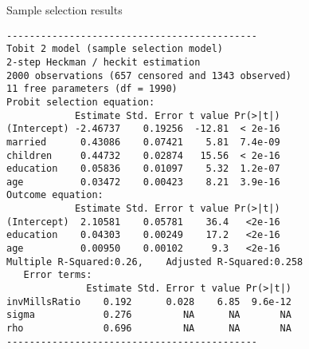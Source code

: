 \documentclass[10pt,ignorenonframetext,]{beamer}
\begin{document}
\begin{frame}[fragile]{Sample selection results}

\scriptsize

\begin{verbatim}
--------------------------------------------
Tobit 2 model (sample selection model)
2-step Heckman / heckit estimation
2000 observations (657 censored and 1343 observed)
11 free parameters (df = 1990)
Probit selection equation:
            Estimate Std. Error t value Pr(>|t|)
(Intercept) -2.46737    0.19256  -12.81  < 2e-16
married      0.43086    0.07421    5.81  7.4e-09
children     0.44732    0.02874   15.56  < 2e-16
education    0.05836    0.01097    5.32  1.2e-07
age          0.03472    0.00423    8.21  3.9e-16
Outcome equation:
            Estimate Std. Error t value Pr(>|t|)
(Intercept)  2.10581    0.05781    36.4   <2e-16
education    0.04303    0.00249    17.2   <2e-16
age          0.00950    0.00102     9.3   <2e-16
Multiple R-Squared:0.26,    Adjusted R-Squared:0.258
   Error terms:
              Estimate Std. Error t value Pr(>|t|)
invMillsRatio    0.192      0.028    6.85  9.6e-12
sigma            0.276         NA      NA       NA
rho              0.696         NA      NA       NA
--------------------------------------------
\end{verbatim}

\end{frame}
\end{document}
